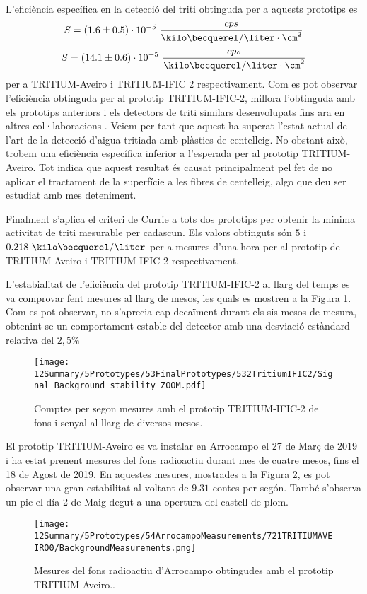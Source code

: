 L'eficiència específica en la detecció del triti obtinguda per a aquests prototips es
$$S = (1.6 \pm 0.5)\cdot{} 10^{-5}~\frac{cps}{\kilo\becquerel/\liter \cdot{} \cm^{2}}$$
$$S = (14.1 \pm 0.6)\cdot{} 10^{-5}~\frac{cps}{\kilo\becquerel/\liter \cdot{} \cm^{2}}$$
per a TRITIUM-Aveiro i TRITIUM-IFIC 2 respectivament. Com es pot observar l'eficiència obtinguda per al prototip TRITIUM-IFIC-2, millora l'obtinguda amb els prototips anteriors i els detectors de triti similars desenvolupats fins ara en altres col·laboracions \cite{Hofstetter1, Hofstetter2}. Veiem per tant que aquest ha superat l'estat actual de l'art de la detecció d'aigua tritiada amb plàstics de centelleig. No obstant això, trobem una eficiència específica inferior a l'esperada per al prototip TRITIUM-Aveiro. Tot indica que aquest resultat és causat principalment pel fet de no aplicar el tractament de la superfície a les fibres de centelleig, algo que deu ser estudiat amb mes deteniment.

Finalment s'aplica el criteri de Currie \cite{CurieLimit} a tots dos prototips per obtenir la mínima activitat de triti mesurable per cadascun. Els valors obtinguts són $5$ i $0.218~\kilo\becquerel/\liter$ per a mesures d'una hora per al prototip de TRITIUM-Aveiro i TRITIUM-IFIC-2 respectivament. 

L'estabialitat de l'eficiència del prototip TRITIUM-IFIC-2 al llarg del temps es va comprovar fent mesures al llarg de mesos, les quals es mostren a la Figura \ref{fig:MonitoritzacioTRITIUMIFIC2}. Com es pot observar, no s'aprecia cap decaïment durant els sis mesos de mesura, obtenint-se un comportament estable del detector amb una desviació estàndard relativa del $2,5\%$

\begin{figure}[h]
\centering
\texttt{[image: 12Summary/5Prototypes/53FinalPrototypes/532TritiumIFIC2/Signal\_Background\_stability\_ZOOM.pdf]}
\caption{Comptes per segon mesures amb el prototip TRITIUM-IFIC-2 de fons i senyal al llarg de diversos mesos.\label{fig:MonitoritzacioTRITIUMIFIC2}}
\end{figure}

El prototip TRITIUM-Aveiro es va instalar en Arrocampo el 27 de Març de 2019 i ha estat prenent mesures del fons radioactiu durant mes de cuatre mesos, fins el 18 de Agost de 2019. En aquestes mesures, mostrades a la Figura \ref{fig:FonsArrocampoAveiro}, es pot observar una gran estabilitat al voltant de $9.31$ contes per segón. També s'observa un pic el día 2 de Maig degut a una opertura del castell de plom.

\begin{figure}[h]
\centering
\texttt{[image: 12Summary/5Prototypes/54ArrocampoMeasurements/721TRITIUMAVEIRO0/BackgroundMeasurements.png]}
\caption{Mesures del fons radioactiu d'Arrocampo obtingudes amb el prototip TRITIUM-Aveiro.\cite{ExperimentalPaperCarlos}.\label{fig:FonsArrocampoAveiro}}
\end{figure}